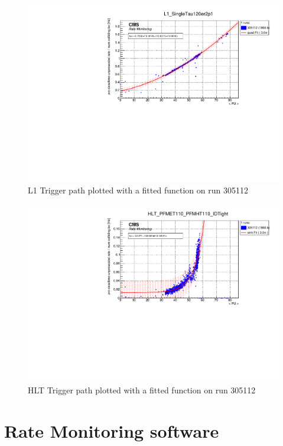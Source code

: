 \begin{figure}
    \centerline{
        \includegraphics[width=0.6\paperwidth]{figures/RMT_305112_L1_SingleTau120er2p1.pdf}}
    \caption{L1 Trigger path plotted with a fitted function on run 305112}
    \label{fig:ratemon_l1}
\end{figure}

\begin{figure}
    \centerline{
        \includegraphics[width=0.6\paperwidth]{figures/RMT_305112_HLT_PFMET110_PFMHT110_IDTight.pdf}}
    \caption{HLT Trigger path plotted with a fitted function on run 305112}
    \label{fig:ratemon_hlt}
\end{figure}

\section{Rate Monitoring software}

